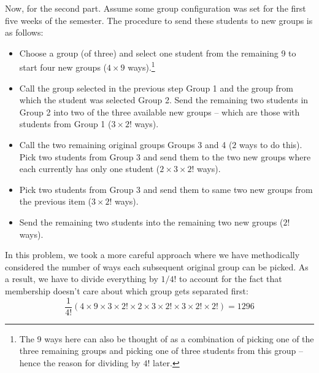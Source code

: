 \documentclass[11pt]{article}
\newcommand{\f}[2]{\frac{#1}{#2}}
\begin{document}
\begin{enumerate}[(a)]
		
	Now, for the second part. Assume some group configuration was set for the first five weeks of the semester. The procedure to send these students to new groups is as follows:
	\begin{itemize}
		\item Choose a group (of three) and select one student from the remaining 9 to start four new groups ($4\times9$ ways).\footnote{The 9 ways here can also be thought of as a combination of picking one of the three remaining groups and picking one of three students from this group -- hence the reason for dividing by $4!$ later.}
		\item Call the group selected in the previous step Group 1 and the group from which the student was selected Group 2. Send the remaining two students in Group 2 into two of the three available new groups --  which are those with students from Group 1 ($3\times 2!$ ways). 
		\item Call the two remaining original groups Groups 3 and 4 ($2$ ways to do this). Pick two students from Group 3 and send them to the two new groups where each currently has only one student ($2\times 3\times 2!$ ways).		
		\item Pick two students from Group 3 and send them to same two new groups from the previous item ($3\times 2!$ ways).
		\item Send the remaining two students into the remaining two new groups ($2!$ ways).
	\end{itemize}
	In this problem, we took a more careful approach where we have methodically considered the number of ways each subsequent original group can be picked. As a result, we have to divide everything by $1/4!$ to account for the fact that membership doesn't care about which group gets separated first: 
	\begin{equation*}
	\f{1}{4!}\left( 4\times 9\times 3\times 2! \times 2\times  3\times 2! \times 3\times 2!\times 2! \right) = \boxed{1296}
	\end{equation*}
\end{enumerate} 





\newpage
\end{document}
